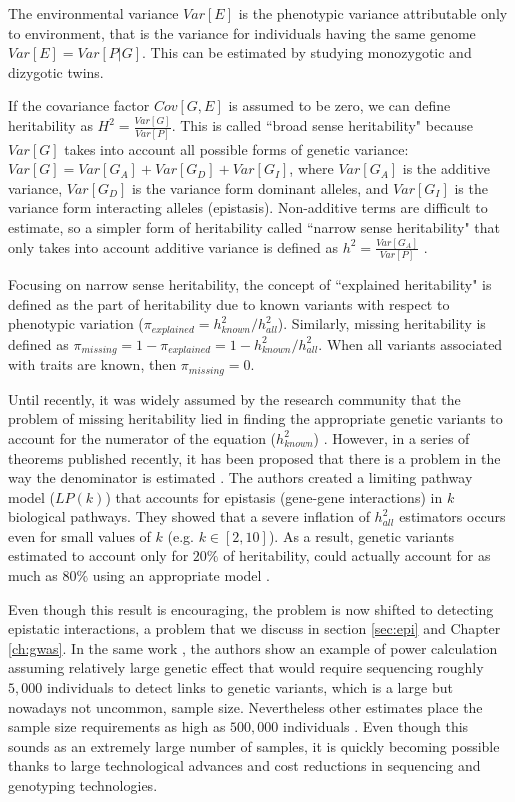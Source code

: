 The environmental variance $Var[E]$ is the phenotypic variance attributable only to environment, that is the variance for individuals having the same genome $Var[E] = Var[P|G]$. This can be estimated by studying monozygotic and dizygotic twins.

If the covariance factor $Cov[G, E]$ is assumed to be zero, we can define heritability as $H^2 = \frac{Var[G] }{ Var[P]}$. This is called ``broad sense heritability" because $Var[G]$ takes into account all possible forms of genetic variance: $Var[G] = Var[G_A] + Var[G_D] + Var[G_I]$, where $Var[G_A]$ is the additive variance, $Var[G_D]$ is the variance form dominant alleles, and $Var[G_I]$ is the variance form interacting alleles (epistasis). Non-additive terms are difficult to estimate, so a simpler form of heritability called ``narrow sense heritability" that only takes into account additive variance is defined as $h^2 = \frac{ Var[G_A] }{ Var[P] }$ \cite{zuk2012mystery}.

Focusing on narrow sense heritability, the concept of ``explained heritability" is defined as the part of heritability due to known variants with respect to phenotypic variation ($\pi_{explained} = h^2_{known} / h^2_{all}$). Similarly, missing heritability is defined as $\pi_{missing} = 1 - \pi_{explained} = 1 - h^2_{known} / h^2_{all}$. When all variants associated with traits are known, then $\pi_{missing} = 0$.

Until recently, it was widely assumed by the research community that the problem of missing heritability lied in finding the appropriate genetic variants to account for the numerator of the equation ($h^2_{known}$) \cite{zuk2012mystery}. However, in a series of theorems published recently, it has been proposed that there is a problem in the way the denominator is estimated \cite{zuk2012mystery}. The authors created a limiting pathway model ($LP(k)$) that accounts for epistasis (gene-gene interactions) in $k$ biological pathways. They showed that a severe inflation of $h^2_{all}$ estimators occurs even for small values of $k$ (e.g. $k \in [2,10]$). As a result, genetic variants estimated to account only for $20\%$ of heritability, could actually account for as much as $80\%$ using an appropriate model \cite{zuk2012mystery}.

Even though this result is encouraging, the problem is now shifted to detecting epistatic interactions, a problem that we discuss in section \ref{sec:epi} and Chapter \ref{ch:gwas}. In the same work \cite{zuk2012mystery}, the authors show an example of power calculation assuming relatively large genetic effect that would require sequencing roughly $5,000$ individuals to detect links to genetic variants, which is a large but nowadays not uncommon, sample size. Nevertheless other estimates place the sample size requirements as high as  $500,000$ individuals \cite{zuk2012mystery}. Even though this sounds as an extremely large number of samples, it is quickly becoming possible thanks to large technological advances and cost reductions in sequencing and genotyping technologies.

